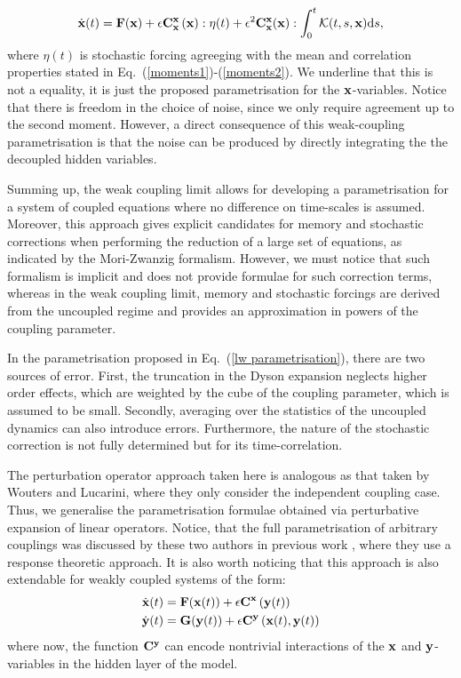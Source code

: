 \documentclass[12pt]{article}
\begin{document}
\begin{equation}\label{lw parametrisation}
	\dot{\mathbf{x}}(t)=\mathbf{F}(\mathbf{x}) + \epsilon \mathbf{C}_{\mathbf{x}}^{\mathbf{x}}\left(\mathbf{x} \right): \eta(t)+\epsilon^2\mathbf{C}_{\mathbf{x}}^{\mathbf{x}}(\mathbf{x}):\int_{0}^t\mathcal{K}(t,s,\mathbf{x})\mathrm{d} s,
\end{equation}
where $\eta(t)$ is stochastic forcing agreeging with the mean and correlation properties stated in Eq.~(\ref{moments1})-(\ref{moments2}). We underline that this is not a equality, it is just the proposed parametrisation for the $\mathbf{x}$-variables. Notice that there is freedom in the choice of noise, since we only require agreement up to the second moment. However, a direct consequence of this weak-coupling parametrisation is that the noise can be produced by directly integrating the the decoupled hidden variables.

Summing up, the weak coupling limit allows for developing a parametrisation for a system of coupled equations where no difference on time-scales is assumed. Moreover, this approach gives explicit candidates for memory and stochastic corrections when performing the reduction of a large set of equations, as indicated by the Mori-Zwanzig formalism. However, we must notice that such formalism is implicit and does not provide formulae for such correction terms, whereas in the weak coupling limit, memory and stochastic forcings are derived from the uncoupled regime and provides an approximation in powers of the coupling parameter.

In the parametrisation proposed in Eq.~(\ref{lw parametrisation}), there are two sources of error. First, the truncation in the Dyson expansion neglects higher order effects, which are weighted by the cube of the coupling parameter, which is assumed to be small. Secondly, averaging over the statistics of the uncoupled dynamics can also introduce errors. Furthermore, the nature of the stochastic correction is not fully determined but for its time-correlation.

The perturbation operator approach taken here is analogous as that taken by Wouters and Lucarini, where they only consider the independent coupling case. Thus, we generalise the parametrisation formulae obtained via perturbative expansion of linear operators. Notice, that the full parametrisation of arbitrary couplings was discussed by these two authors in previous work \cite{Wouters2012}, where they use a response theoretic approach. It is also worth noticing that this approach is also extendable for weakly coupled systems of the form:
\begin{align}
\label{mle12}
\dot{\mathbf{x}}(t) &= \mathbf{F}(\mathbf{x}(t)) + \epsilon \mathbf{C}^{\mathbf{x}}\left(\mathbf{y}(t) \right) \\
\label{mle22}
\dot{\mathbf{y}}(t) &= \mathbf{G}(\mathbf{y}(t)) + \epsilon \mathbf{C}^{\mathbf{y}}\left(\mathbf{x}(t),\mathbf{y}(t) \right)
\end{align}
where now, the function $\mathbf{C}^{\mathbf{y}}$ can encode nontrivial interactions of the $\mathbf{x}$ and $\mathbf{y}$-variables in the hidden layer of the model.
\end{document}
